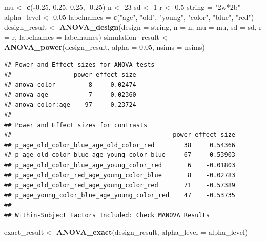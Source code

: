 \documentclass[]{book}
\newenvironment{Shaded}{\begin{snugshade}}{\end{snugshade}}
\newcommand{\DataTypeTok}[1]{\textcolor[rgb]{0.13,0.29,0.53}{#1}}
\newcommand{\DecValTok}[1]{\textcolor[rgb]{0.00,0.00,0.81}{#1}}
\newcommand{\FloatTok}[1]{\textcolor[rgb]{0.00,0.00,0.81}{#1}}
\newcommand{\KeywordTok}[1]{\textcolor[rgb]{0.13,0.29,0.53}{\textbf{#1}}}
\newcommand{\NormalTok}[1]{#1}
\newcommand{\OperatorTok}[1]{\textcolor[rgb]{0.81,0.36,0.00}{\textbf{#1}}}
\newcommand{\StringTok}[1]{\textcolor[rgb]{0.31,0.60,0.02}{#1}}
\begin{document}
\begin{Shaded}
\begin{Highlighting}[]
\NormalTok{mu <-}\StringTok{ }\KeywordTok{c}\NormalTok{(}\OperatorTok{-}\FloatTok{0.25}\NormalTok{, }\FloatTok{0.25}\NormalTok{, }\FloatTok{0.25}\NormalTok{, }\FloatTok{-0.25}\NormalTok{)}
\NormalTok{n <-}\StringTok{ }\DecValTok{23}
\NormalTok{sd <-}\StringTok{ }\DecValTok{1}
\NormalTok{r <-}\StringTok{ }\FloatTok{0.5}
\NormalTok{string =}\StringTok{ "2w*2b"}
\NormalTok{alpha_level <-}\StringTok{ }\FloatTok{0.05}
\NormalTok{labelnames =}\StringTok{ }\KeywordTok{c}\NormalTok{(}\StringTok{"age"}\NormalTok{, }\StringTok{"old"}\NormalTok{, }\StringTok{"young"}\NormalTok{, }\StringTok{"color"}\NormalTok{, }\StringTok{"blue"}\NormalTok{, }\StringTok{"red"}\NormalTok{)}
\NormalTok{design_result <-}\StringTok{ }\KeywordTok{ANOVA_design}\NormalTok{(}\DataTypeTok{design =}\NormalTok{ string,}
                              \DataTypeTok{n =}\NormalTok{ n, }
                              \DataTypeTok{mu =}\NormalTok{ mu, }
                              \DataTypeTok{sd =}\NormalTok{ sd, }
                              \DataTypeTok{r =}\NormalTok{ r, }
                              \DataTypeTok{labelnames =}\NormalTok{ labelnames)}
\NormalTok{simulation_result <-}\StringTok{ }\KeywordTok{ANOVA_power}\NormalTok{(design_result, }\DataTypeTok{alpha =} \FloatTok{0.05}\NormalTok{, }\DataTypeTok{nsims =}\NormalTok{ nsims)}
\end{Highlighting}
\end{Shaded}

\begin{verbatim}
## Power and Effect sizes for ANOVA tests
##                 power effect_size
## anova_color         8     0.02474
## anova_age           7     0.02360
## anova_color:age    97     0.23724
## 
## Power and Effect sizes for contrasts
##                                            power effect_size
## p_age_old_color_blue_age_old_color_red        38     0.54366
## p_age_old_color_blue_age_young_color_blue     67     0.53903
## p_age_old_color_blue_age_young_color_red       6    -0.01803
## p_age_old_color_red_age_young_color_blue       8    -0.02783
## p_age_old_color_red_age_young_color_red       71    -0.57389
## p_age_young_color_blue_age_young_color_red    47    -0.53735
## 
## Within-Subject Factors Included: Check MANOVA Results
\end{verbatim}

\begin{Shaded}
\begin{Highlighting}[]
\NormalTok{exact_result <-}\StringTok{ }\KeywordTok{ANOVA_exact}\NormalTok{(design_result, }\DataTypeTok{alpha_level =}\NormalTok{ alpha_level)}
\end{Highlighting}
\end{Shaded}
\end{document}
